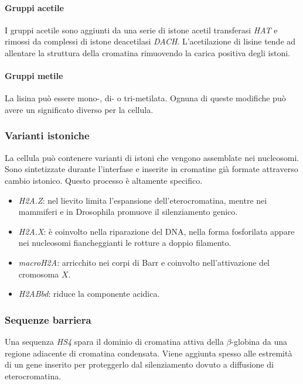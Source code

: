 			\paragraph{Gruppi acetile}
			I gruppi acetile sono aggiunti da una serie di istone acetil transferasi \emph{HAT} e rimossi da complessi di istone deacetilasi \emph{DACH}.
			L'acetilazione di lisine tende ad allentare la struttura della cromatina rimuovendo la carica positiva degli istoni.

			\paragraph{Gruppi metile}
			La lisina pu\`o essere mono-, di- o tri-metilata.
			Ognuna di queste modifiche pu\`o avere un significato diverso per la cellula.

		\subsubsection{Varianti istoniche}
		La cellula pu\`o contenere varianti di istoni che vengono assemblate nei nucleosomi.
		Sono sintetizzate durante l'interfase e inserite in cromatine gi\`a formate attraverso cambio istonico.
		Questo processo \`e altamente specifico.
		\begin{multicols}{2}
			\begin{itemize}
				\item \emph{H2A.Z}: nel lievito limita l'espansione dell'eterocromatina, mentre nei mammiferi e in Drosophila promuove il silenziamento genico.
				\item \emph{H2A.X}: \`e coinvolto nella riparazione del DNA, nella forma fosforilata appare nei nucleosomi fiancheggianti le rotture a doppio filamento.
				\item \emph{macroH2A}: arricchito nei corpi di Barr e coinvolto nell'attivazione del cromosoma $X$.
				\item \emph{H2ABbd}: riduce la componente acidica.
			\end{itemize}
		\end{multicols}

		\subsubsection{Sequenze barriera}
		Una sequenza \emph{HS4} spara il dominio di cromatina attiva della $\beta$-globina da una regione adiacente di cromatina condensata.
		Viene aggiunta spesso alle estremit\`a di un gene inserito per proteggerlo dal silenziamento dovuto a diffusione di eterocromatina.

